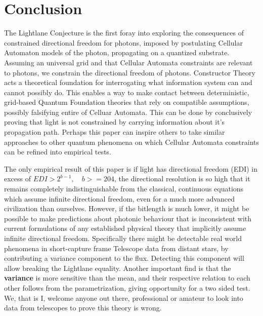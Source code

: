 \documentclass[notitlepage]{article}
\begin{document}
\section{Conclusion}
The Lightlane Conjecture is the first foray into exploring the consequences of constrained directional freedom for photons, imposed by postulating Cellular Automaton models of the photon, propagating on a quantized substrate. 
Assuming an universal grid and that Cellular Automata constraints are relevant to photons, we constrain the directional freedom of photons. Constructor Theory acts a theoretical foundation for interrogating what information system can and cannot possibly do. This enables a way to make contact between deterministic, grid-based Quantum Foundation theories that rely on compatible assumptions, possibly falsifying entire of Celluar Automata. This can be done by conclusively proving that light is not constrained by carrying information about it's propagation path. Perhaps this paper can inspire others to take similar approaches to other quantum phenomena on which Cellular Automata constraints can be refined into empirical tests. 

The only empirical result of this paper is if light has directional freedom (EDI) in excess of $EDI > 2^{b-1}, \quad b >= 204$, the directional resolution is so high that it remains completely indistinguishable from the classical, continuous equations which assume infinite directional freedom, even for a much more advanced civilization than ourselves. However, if the bitlength is much lower, it might be possible to make predictions about photonic behaviour that is inconsistent with current formulations of any established physical theory that implicitly assume infinite directional freedom. Specifically there might be detectable real world phenomena in short-capture frame Telescope data from distant stars, by contributing a variance component to the flux. Detecting this component will allow breaking the Lightlane equality. Another important find is that the \textbf{variance} is more sensitive than the mean, and their respective relation to each other follows from the parametrization, giving opportunity for a two sided test. We, that is I, welcome anyone out there, professional or amateur to look into data from telescopes to prove this theory is wrong.
\end{document}
